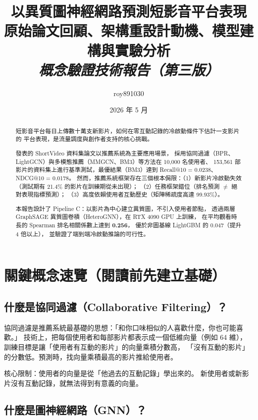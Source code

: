 \documentclass[12pt, a4paper]{article}
\title{
  \vspace{-1cm}
  {\LARGE\bfseries 以異質圖神經網路預測短影音平台表現}\\[0.5em]
  {\large 原始論文回顧、架構重設計動機、模型建構與實驗分析}\\[0.4em]
  {\normalsize\itshape 概念驗證技術報告（第三版）}
}
\author{roy891030}
\date{2026 年 5 月}
\begin{document}
\maketitle\thispagestyle{fancy}

\begin{abstract}
短影音平台每日上傳數十萬支新影片，如何在零互動記錄的冷啟動條件下估計一支影片的
平台表現，是流量調度與創作者支持的核心挑戰。

\citet{shang2025shortvideo} 發表的 ShortVideo 資料集論文以推薦系統為主要應用場景，
採用協同過濾（BPR、LightGCN）與多模態推薦（MMGCN、BM3）等方法在 10,000 名使用者、
153,561 部影片的資料集上進行基準測試，最優結果（BM3）達到
Recall@10 = 0.0238、NDCG@10 = 0.0178。
然而，推薦系統框架存在三個根本侷限：（1）新影片冷啟動失效
（測試期有 21.4\% 的影片在訓練期從未出現）；
（2）任務框架錯位（排名預測 $\neq$ 絕對表現指標預測）；
（3）高度依賴使用者互動歷史（矩陣稀疏度高達 99.93\%）。

本報告設計了 Pipeline C：以影片為中心建立異質圖，不引入使用者節點，
透過兩層 GraphSAGE 異質圖卷積（HeteroGNN），在 RTX 4090 GPU 上訓練，
在平均觀看時長的 Spearman 排名相關係數上達到 \textbf{0.256}，
優於非圖基線 LightGBM 的 0.047（提升 4 倍以上），
並驗證了端到端冷啟動推論的可行性。
\end{abstract}

\tableofcontents\newpage

\section{關鍵概念速覽（閱讀前先建立基礎）}
\label{sec:concepts}

\subsection*{什麼是協同過濾（Collaborative Filtering）？}

協同過濾是推薦系統最基礎的思想：「和你口味相似的人喜歡什麼，你也可能喜歡。」
技術上，把每個使用者和每部影片都表示成一個低維向量（例如 64 維），
訓練目標是讓「使用者有互動的影片」的向量乘積分數高，
「沒有互動的影片」的分數低。預測時，找向量乘積最高的影片推給使用者。

核心限制：使用者的向量是從「他過去的互動記錄」學出來的。
新使用者或新影片沒有互動記錄，就無法得到有意義的向量。

\subsection*{什麼是圖神經網路（GNN）？}
\end{document}

